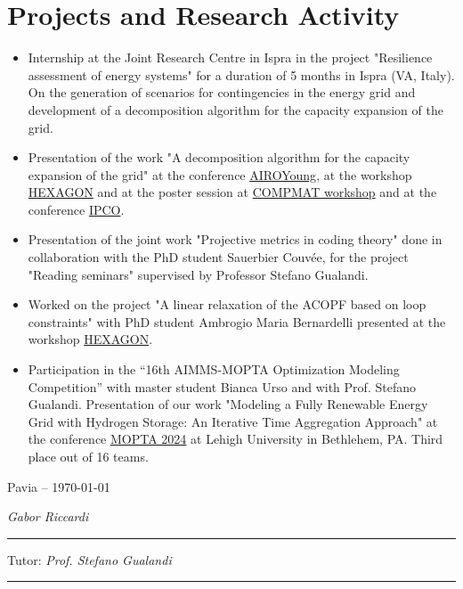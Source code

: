 \documentclass[a4paper,11pt]{report}
\begin{document}
\section*{Projects and Research Activity}
\begin{itemize}
    \item Internship at the Joint Research Centre in Ispra in the project "Resilience assessment of energy systems" for a duration of 5 months in Ispra (VA, Italy). On the generation of scenarios for contingencies in the energy grid and development of a decomposition algorithm for the capacity expansion of the grid.  
    \item Presentation of the work "A decomposition algorithm for the capacity expansion of the grid" at the conference \href{https://www.unical.it/ayw2024/programme/}{AIROYoung}, at the workshop \href{https://hexagon.deib.polimi.it/workshop/}{HEXAGON} and at the poster session at \href{https://sites.google.com/universitadipavia.it/compmat-spring-workshop/poster-session}{COMPMAT workshop} and at the conference \href{https://ipco2024.ii.uni.wroc.pl/}{IPCO}.
    \item Presentation of the joint work "Projective metrics in coding theory" done in collaboration with the PhD student Sauerbier Couvée, for the  project "Reading seminars" supervised by Professor Stefano Gualandi.
    \item Worked on the project "A linear relaxation of the ACOPF based on loop constraints" with PhD student Ambrogio Maria Bernardelli presented at the workshop \href{https://www.hexagon.deib.polimi.it/workshop/}{HEXAGON}.
    \item Participation in the “16th AIMMS-MOPTA Optimization Modeling Competition” with master student Bianca Urso and with Prof. Stefano Gualandi. Presentation of our work "Modeling a Fully Renewable Energy Grid with Hydrogen Storage: An Iterative Time Aggregation Approach" at the conference \href{https://coral.ise.lehigh.edu/~mopta/}{MOPTA 2024} at Lehigh University in
    Bethlehem, PA. Third place out of 16 teams.
\end{itemize}


\newpage
Pavia -- \today
\begin{flushleft}
    \leftskip=9.5cm	
    \emph{Gabor Riccardi}
\end{flushleft}
\vspace*{0.75cm}

\begin{flushleft}
    \leftskip=9.5cm	
    \rule{50mm}{0.25mm}
\end{flushleft}

\vspace{1.5cm}
	
\begin{flushleft}
    \leftskip=9.5cm	
    Tutor: \emph{Prof. Stefano Gualandi}
\end{flushleft}

\vspace*{0.75cm}
\begin{flushleft}
    \leftskip=9.5cm	
    \rule{50mm}{0.25mm}
\end{flushleft}


\vspace{1cm}
\end{document}
